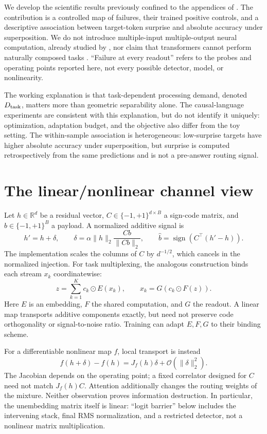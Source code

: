 \documentclass[11pt]{article}
\begin{document}
We develop the scientific results previously confined to the appendices of \citet{previous}. The contribution is a controlled map of failures, their trained positive controls, and a descriptive association between target-token surprise and absolute accuracy under superposition. We do not introduce multiple-input multiple-output neural computation, already studied by \citet{menet2023}, nor claim that transformers cannot perform naturally composed tasks \citep{xiong2024}. ``Failure at every readout'' refers to the probes and operating points reported here, not every possible detector, model, or nonlinearity.

The working explanation is that task-dependent processing demand, denoted $D_{\rm task}$, matters more than geometric separability alone. The causal-language experiments are consistent with this explanation, but do not identify it uniquely: optimization, adaptation budget, and the objective also differ from the toy setting. The within-sample association is heterogeneous: low-surprise targets have higher absolute accuracy under superposition, but surprise is computed retrospectively from the same predictions and is not a pre-answer routing signal.

\section{The linear/nonlinear channel view}
Let $h\in\mathbb R^d$ be a residual vector, $C\in\{-1,+1\}^{d\times B}$ a sign-code matrix, and $b\in\{-1,+1\}^B$ a payload. A normalized additive signal is
\begin{equation}
 h'=h+\delta,\qquad \delta=\alpha\lVert h\rVert_2\frac{Cb}{\lVert Cb\rVert_2},\qquad
 \widehat b=\operatorname{sign}\!\left(C^\top(h'-h)\right).
 \label{eq:watermark}
\end{equation}
The implementation scales the columns of $C$ by $d^{-1/2}$, which cancels in the normalized injection. For task multiplexing, the analogous construction binds each stream $x_k$ coordinatewise:
\begin{equation}
 z=\sum_{k=1}^K c_k\odot E(x_k),\qquad
 \widehat x_k=G\!\left(c_k\odot F(z)\right).
 \label{eq:multiplex}
\end{equation}
Here $E$ is an embedding, $F$ the shared computation, and $G$ the readout. A linear map transports additive components exactly, but need not preserve code orthogonality or signal-to-noise ratio. Training can adapt $E,F,G$ to their binding scheme.

For a differentiable nonlinear map $f$, local transport is instead
\begin{equation}
 f(h+\delta)-f(h)=J_f(h)\delta+\mathcal O(\lVert\delta\rVert_2^2).
\end{equation}
The Jacobian depends on the operating point; a fixed correlator designed for $C$ need not match $J_f(h)C$. Attention additionally changes the routing weights of the mixture. Neither observation proves information destruction. In particular, the unembedding matrix itself is linear: ``logit barrier'' below includes the intervening stack, final RMS normalization, and a restricted detector, not a nonlinear matrix multiplication.
\end{document}
